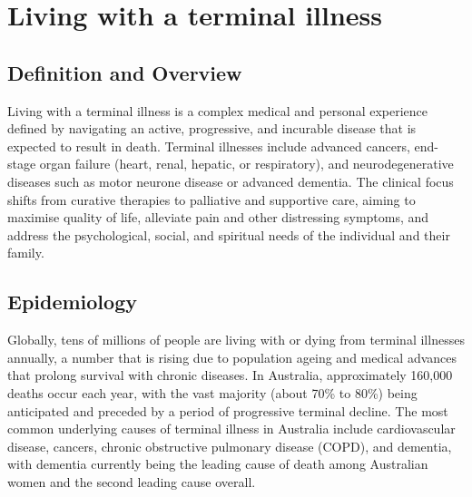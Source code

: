 \chapter{Living with a terminal illness}

\section*{Definition and Overview}
Living with a terminal illness is a complex medical and personal experience defined by navigating an active, progressive, and incurable disease that is expected to result in death. Terminal illnesses include advanced cancers, end-stage organ failure (heart, renal, hepatic, or respiratory), and neurodegenerative diseases such as motor neurone disease or advanced dementia. The clinical focus shifts from curative therapies to palliative and supportive care, aiming to maximise quality of life, alleviate pain and other distressing symptoms, and address the psychological, social, and spiritual needs of the individual and their family.

\section*{Epidemiology}
Globally, tens of millions of people are living with or dying from terminal illnesses annually, a number that is rising due to population ageing and medical advances that prolong survival with chronic diseases. In Australia, approximately 160,000 deaths occur each year, with the vast majority (about 70\% to 80\%) being anticipated and preceded by a period of progressive terminal decline. The most common underlying causes of terminal illness in Australia include cardiovascular disease, cancers, chronic obstructive pulmonary disease (COPD), and dementia, with dementia currently being the leading cause of death among Australian women and the second leading cause overall.

